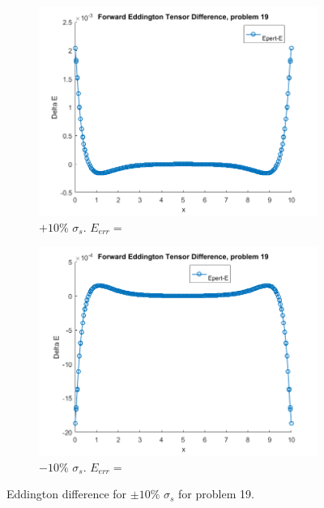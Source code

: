\documentclass{article}
\begin{document}
\begin{figure}[H]
\centering
\begin{subfigure}{.5\textwidth}
  \centering
  \includegraphics[width=1\linewidth]{p19deltaEdss10.png}
  \caption{$+10\%$ $\sigma_s$. $E_{err}=$}
  \label{fig:sub1}
\end{subfigure}%
\begin{subfigure}{.5\textwidth}
  \centering
  \includegraphics[width=1\linewidth]{p19deltaEdss-10.png}
  \caption{$-10\%$ $\sigma_s$. $E_{err}=$}
  \label{fig:sub2}
\end{subfigure}
\caption{Eddington difference for $\pm10\%$ $\sigma_s$ for problem 19.}
\label{fig:test}
\end{figure}
\end{document}
